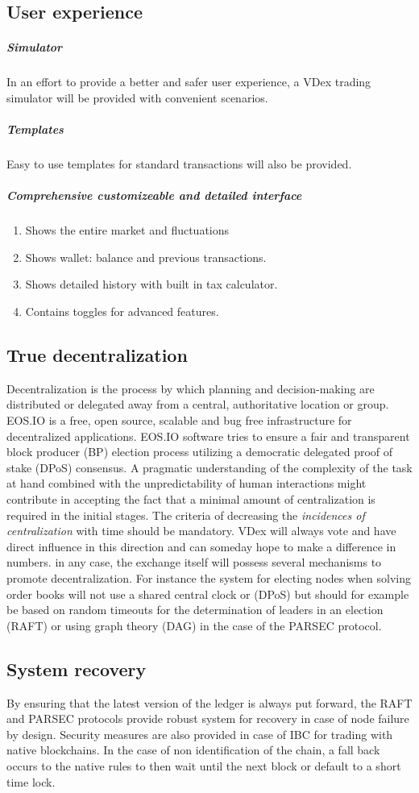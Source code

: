 \documentclass[]{article}
\begin{document}
	\subsection{User experience}
	\subparagraph{Simulator}
	In an effort to provide a better and safer user experience, 
	a VDex trading simulator will be provided with convenient scenarios.
	\subparagraph{Templates}
	Easy to use templates for standard transactions will also be provided.
	\subparagraph{Comprehensive customizeable and detailed interface}
	\begin{enumerate}
		\item Shows the entire market and fluctuations
		\item Shows wallet: balance and previous transactions.
		\item Shows detailed history with built in tax calculator.
		\item Contains toggles for advanced features.		 
	\end{enumerate}
	
	\subsection{True decentralization}
	 Decentralization is the process by which planning and decision-making are distributed or delegated away from a central, authoritative location or group.
	 EOS.IO is a free, open source, scalable and bug free infrastructure for decentralized applications. EOS.IO software tries to ensure a fair and transparent block producer (BP) election process utilizing a democratic delegated proof of stake (DPoS) consensus.
	 A pragmatic understanding of the complexity of the task at hand combined with the unpredictability of human interactions might contribute in accepting the fact that a minimal amount of centralization is required in the initial stages.
	 The criteria of decreasing the \textit{incidences of centralization} with time should be mandatory. VDex will always vote and have direct influence in this direction and can someday hope to make a difference in numbers.
	 in any case, the exchange itself will possess several mechanisms to promote decentralization. For instance the system for electing nodes when solving order books will not use a shared central clock or (DPoS) but should for example be based on random timeouts for the determination of leaders in an election (RAFT) or using graph theory (DAG) in the case of the PARSEC protocol.
	 
	\subsection{System recovery}
	By ensuring that the latest version of the ledger is always put forward, 
	the RAFT and PARSEC protocols provide robust system for recovery in case of node failure by design.
	Security measures are also provided in case of IBC for trading with native blockchains. In the case of non identification of the chain, a fall back occurs to the native rules to then  wait until the next block or default to a short time lock.
	
\end{document}
